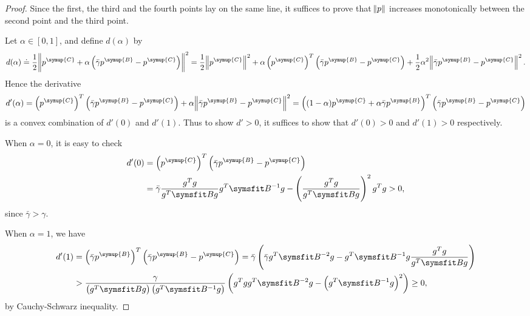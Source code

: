 \documentclass{assignment}[2019/10/15]
\newcommand{\B}{\matr{B}}
\newcommand{\Bi}{\matr{B}^{-1}}
\newcommand{\Bii}{\matr{B}^{-2}}
\newcommand{\pC}{p^{\symup{C}}}
\newcommand{\pB}{p^{\symup{B}}}
\begin{document}
    \begin{proof}
        Since the first, the third and the fourth points lay on the same line, it suffices to prove that $\norm{p}$ increases monotonically between the second point and the third point.

        Let $\alpha\in[0,1]$, and define $d(\alpha)$ by
        \begin{equation}
            d(\alpha)\doteq\frac{1}{2}\norm{\pC+\alpha\left(\bar{\gamma}\pB-\pC\right)}^2=\frac{1}{2}\norm{\pC}^2+\alpha\left(\pC\right)^T\left(\bar{\gamma}\pB-\pC\right)+\frac{1}{2}\alpha^2\norm{\bar{\gamma}\pB-\pC}^2.
        \end{equation}
        Hence the derivative
        \begin{equation}
            d'(\alpha)=\left(\pC\right)^T\left(\bar{\gamma}\pB-\pC\right)+\alpha\norm{\bar{\gamma}\pB-\pC}^2=\left((1-\alpha)\pC+\alpha\bar{\gamma}\pB\right)^T\left(\bar{\gamma}\pB-\pC\right)
        \end{equation}
        is a convex combination of $d'(0)$ and $d'(1)$. Thus to show $d'>0$, it suffices to show that $d'(0)>0$ and $d'(1)>0$ respectively.

        When $\alpha=0$, it is easy to check
        \begin{equation}
            \begin{aligned}
                d'(0)&= \left(\pC\right)^T\left(\bar{\gamma}\pB-\pC\right)\\
                &= \bar{\gamma}\frac{g^Tg}{g^T\B g}g^T \Bi g-\left(\frac{g^T g}{g^T\B g}\right)^2 g^T g>0,
            \end{aligned}
        \end{equation}
        since $\bar{\gamma}>\gamma$.

        When $\alpha=1$, we have
        \begin{equation}
            \begin{aligned}
                d'(1)&= \left(\bar{\gamma}\pB\right)^T\left(\bar{\gamma}\pB-\pC\right)
                = \bar{\gamma}\left(\bar{\gamma}g^T\Bii g- g^T\Bi g\frac{g^Tg}{g^T\B g}\right)\\
                &> \frac{\gamma}{\left(g^T\B g\right)\left(g^T\Bi g\right)}\left(g^Tgg^T\Bii g-\left(g^T\Bi g\right)^2\right)\geq 0,
            \end{aligned}
        \end{equation}
        by Cauchy-Schwarz inequality.
    \end{proof}
\end{document}
